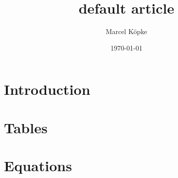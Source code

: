 \documentclass[a4paper, 12pt]{article}
\title{default article}
\author{Marcel Köpke}
\date{\today}
\begin{document}
\maketitle

\tableofcontents


\section{Introduction}
\label{sec:introduction}


\clearpage
\section{Tables}
\label{sec:tables}


\clearpage
\section{Equations}
\label{sec:equations}



\clearpage
\printbibliography
\end{document}
